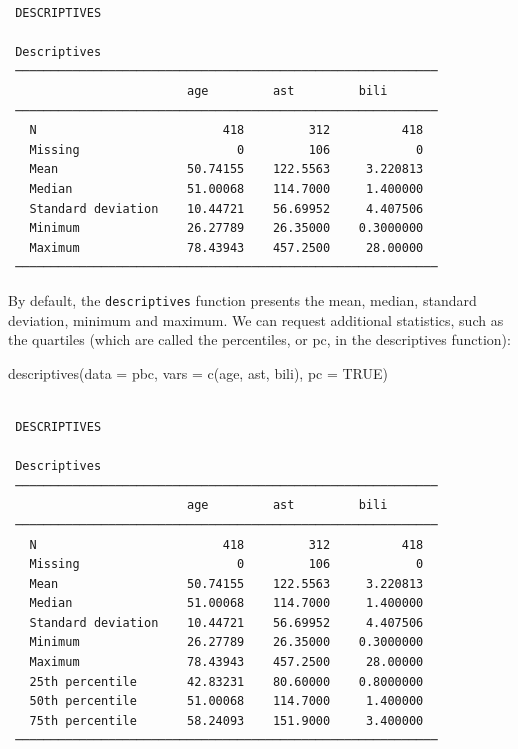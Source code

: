 \documentclass[
  a4paper,
]{memoir}
\newenvironment{Shaded}{\begin{snugshade}}{\end{snugshade}}
\newcommand{\AttributeTok}[1]{\textcolor[rgb]{0.00,0.00,0.00}{#1}}
\newcommand{\ConstantTok}[1]{\textcolor[rgb]{0.00,0.00,0.00}{#1}}
\newcommand{\FunctionTok}[1]{\textcolor[rgb]{0.00,0.00,0.00}{#1}}
\newcommand{\NormalTok}[1]{\textcolor[rgb]{0.00,0.00,0.00}{#1}}
\begin{document}
\begin{verbatim}

 DESCRIPTIVES

 Descriptives                                                
 ─────────────────────────────────────────────────────────── 
                         age         ast         bili        
 ─────────────────────────────────────────────────────────── 
   N                          418         312          418   
   Missing                      0         106            0   
   Mean                  50.74155    122.5563     3.220813   
   Median                51.00068    114.7000     1.400000   
   Standard deviation    10.44721    56.69952     4.407506   
   Minimum               26.27789    26.35000    0.3000000   
   Maximum               78.43943    457.2500     28.00000   
 ─────────────────────────────────────────────────────────── 
\end{verbatim}

By default, the \texttt{descriptives} function presents the mean,
median, standard deviation, minimum and maximum. We can request
additional statistics, such as the quartiles (which are called the
percentiles, or pc, in the descriptives function):

\begin{Shaded}
\begin{Highlighting}[]
\FunctionTok{descriptives}\NormalTok{(}\AttributeTok{data =}\NormalTok{ pbc, }\AttributeTok{vars =} \FunctionTok{c}\NormalTok{(age, ast, bili), }\AttributeTok{pc =} \ConstantTok{TRUE}\NormalTok{)}
\end{Highlighting}
\end{Shaded}

\begin{verbatim}

 DESCRIPTIVES

 Descriptives                                                
 ─────────────────────────────────────────────────────────── 
                         age         ast         bili        
 ─────────────────────────────────────────────────────────── 
   N                          418         312          418   
   Missing                      0         106            0   
   Mean                  50.74155    122.5563     3.220813   
   Median                51.00068    114.7000     1.400000   
   Standard deviation    10.44721    56.69952     4.407506   
   Minimum               26.27789    26.35000    0.3000000   
   Maximum               78.43943    457.2500     28.00000   
   25th percentile       42.83231    80.60000    0.8000000   
   50th percentile       51.00068    114.7000     1.400000   
   75th percentile       58.24093    151.9000     3.400000   
 ─────────────────────────────────────────────────────────── 
\end{verbatim}
\end{document}
